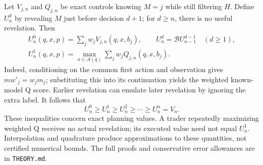 Let $V_{j,n}$ and $Q_{j,n}$ be exact controls knowing $M=j$ while still filtering
$H$. Define $U_n^d$ by revealing $M$ just before decision $d+1$; for $d\ge n$,
there is no useful revelation. Then
\begin{equation}
 \begin{gathered}
 U_n^0(q,x,p)=\sum_j w_jV_{j,n}(q,x,b_j),\qquad
 U_n^d=\mathcal B U_{n-1}^{d-1}\quad(d\ge1),\\[-2pt]
 U_n^1(q,x,p)=\max_{a\in\mathcal A(q)}\sum_jw_jQ_{j,n}(q,x,b_j).
 \end{gathered}
\end{equation}
Indeed, conditioning on the common first action and observation gives
$m w'_j=w_jm_j$; substituting this into its continuation yields the weighted
known-model Q score. Earlier revelation can emulate later revelation by ignoring
the extra label. It follows that
\begin{equation}
 U_n^0\ge U_n^1\ge U_n^2\ge\cdots\ge U_n^n=V_n.
\end{equation}
These inequalities concern exact planning values. A trader repeatedly maximizing
weighted Q receives no actual revelation; its executed value need not equal
$U_n^1$. Interpolation and quadrature produce approximations to these quantities,
not certified numerical bounds. The full proofs and conservative error
allowances are in \texttt{THEORY.md}.
